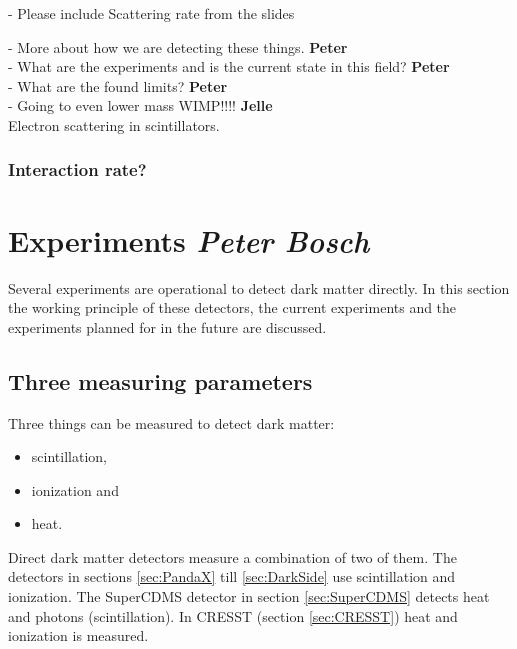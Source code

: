 \documentclass{article}
\begin{document}
 
- Please include Scattering rate from the slides


- More about how we are detecting these things. \textbf{Peter}\\
- What are the experiments and is the current state in this field? \textbf{Peter}\\
- What are the found limits? \textbf{Peter}\\
- Going to even lower mass WIMP!!!! \textbf{Jelle}\\

Electron scattering in scintillators. 


\subsubsection{Interaction rate?}

\newpage
\FloatBarrier
\section{Experiments \small{\textit{Peter Bosch}}}

Several experiments are operational to detect dark matter directly. In this section the working principle of these detectors, the current experiments and the experiments planned for in the future are discussed.

\subsection{Three measuring parameters}
Three things can be measured to detect dark matter:
\begin{itemize}
    \item scintillation,
    \item ionization and
    \item heat.
\end{itemize}
Direct dark matter detectors measure a combination of two of them. The detectors in sections \ref{sec:PandaX} till \ref{sec:DarkSide} use scintillation and ionization. The SuperCDMS detector in section \ref{sec:SuperCDMS} detects heat and photons (scintillation). In CRESST (section \ref{sec:CRESST}) heat and ionization is measured.
\end{document}

